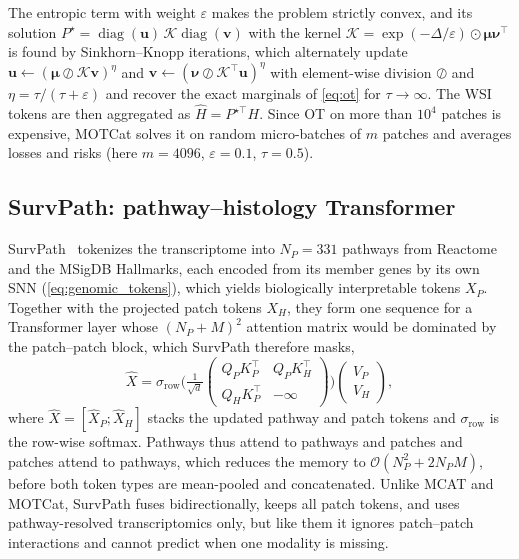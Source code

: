 \documentclass[10pt,twocolumn,letterpaper]{article}
\DeclareMathOperator{\diag}{diag}
\begin{document}
The entropic term with weight $\varepsilon$ makes the problem strictly convex, and its solution $P^\star=\diag(\mathbf{u})\,\mathcal{K}\diag(\mathbf{v})$ with the kernel $\mathcal{K}=\exp(-\Delta/\varepsilon)\odot\bm{\mu}\bm{\nu}^\top$ is found by Sinkhorn--Knopp iterations, which alternately update $\mathbf{u}\leftarrow(\bm{\mu}\oslash\mathcal{K}\mathbf{v})^{\eta}$ and $\mathbf{v}\leftarrow(\bm{\nu}\oslash\mathcal{K}^\top\mathbf{u})^{\eta}$ with element-wise division $\oslash$ and $\eta=\tau/(\tau+\varepsilon)$ and recover the exact marginals of \cref{eq:ot} for $\tau\to\infty$. The WSI tokens are then aggregated as $\hat H=P^{\star\top}H$. Since OT on more than $10^4$ patches is expensive, MOTCat solves it on random micro-batches of $m$ patches and averages losses and risks (here $m=4096$, $\varepsilon=0.1$, $\tau=0.5$).

\subsection{SurvPath: pathway--histology Transformer}
\label{sec:survpath}

SurvPath~\cite{jaume2024survpath} tokenizes the transcriptome into $N_P=331$ pathways from Reactome and the MSigDB Hallmarks, each encoded from its member genes by its own SNN (\cref{eq:genomic_tokens}), which yields biologically interpretable tokens $X_P$. Together with the projected patch tokens $X_H$, they form one sequence for a Transformer layer whose $(N_P+M)^2$ attention matrix would be dominated by the patch--patch block, which SurvPath therefore masks,
\begin{equation}
  \hat X = \sigma_{\mathrm{row}}\Big(\tfrac{1}{\sqrt{d}}\begin{pmatrix}Q_PK_P^\top & Q_PK_H^\top\\ Q_HK_P^\top & -\infty\end{pmatrix}\Big)\begin{pmatrix}V_P\\ V_H\end{pmatrix}, \label{eq:survpath}
\end{equation}
where $\hat X=[\hat X_P;\hat X_H]$ stacks the updated pathway and patch tokens and $\sigma_{\mathrm{row}}$ is the row-wise softmax. Pathways thus attend to pathways and patches and patches attend to pathways, which reduces the memory to $\mathcal{O}(N_P^2+2N_PM)$, before both token types are mean-pooled and concatenated. Unlike MCAT and MOTCat, SurvPath fuses bidirectionally, keeps all patch tokens, and uses pathway-resolved transcriptomics only, but like them it ignores patch--patch interactions and cannot predict when one modality is missing.
\end{document}
